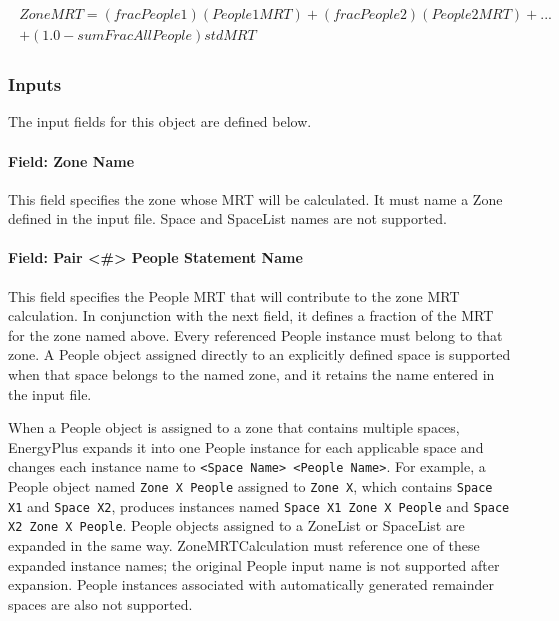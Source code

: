 \begin{align}
\begin{split}
ZoneMRT = (fracPeople1)(People1MRT) + (fracPeople2)(People2MRT) + ... \\
        + (1.0-sumFracAllPeople)stdMRT
\end{split}
\end{align}

\subsubsection{Inputs}\label{inputs-zonemrtcalculation}

The input fields for this object are defined below.

\paragraph{Field: Zone Name}\label{field-zonemrtcalculation-zonename}

This field specifies the zone whose MRT will be calculated. It must name a Zone defined in the input file. Space and SpaceList names are not supported.

\paragraph{Field: Pair \textless{}\#\textgreater{} People Statement Name}\label{field-zonemrtcalculation-peoplenameX}

This field specifies the People MRT that will contribute to the zone MRT calculation. In conjunction with the next field, it defines a fraction of the MRT for the zone named above. Every referenced People instance must belong to that zone. A People object assigned directly to an explicitly defined space is supported when that space belongs to the named zone, and it retains the name entered in the input file.

When a People object is assigned to a zone that contains multiple spaces, EnergyPlus expands it into one People instance for each applicable space and changes each instance name to \texttt{<Space Name> <People Name>}. For example, a People object named \texttt{Zone X People} assigned to \texttt{Zone X}, which contains \texttt{Space X1} and \texttt{Space X2}, produces instances named \texttt{Space X1 Zone X People} and \texttt{Space X2 Zone X People}. People objects assigned to a ZoneList or SpaceList are expanded in the same way. ZoneMRTCalculation must reference one of these expanded instance names; the original People input name is not supported after expansion. People instances associated with automatically generated remainder spaces are also not supported.

